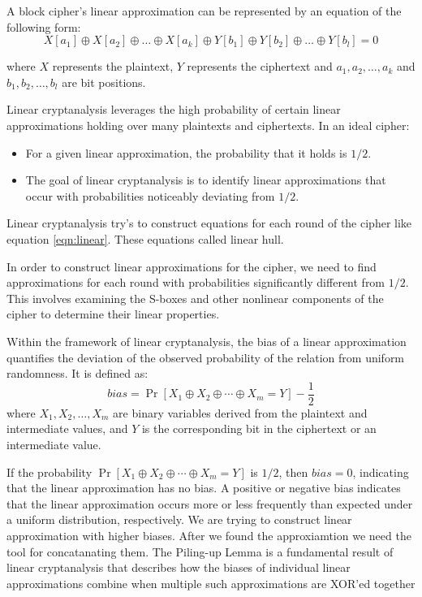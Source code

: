 \begin{definition}
A block cipher’s linear approximation can be represented by an equation of the following form:
\begin{equation}
 X[a_1] \oplus X[a_2] \oplus \ldots \oplus X[a_k] \oplus Y[b_1] \oplus Y[b_2] \oplus \ldots \oplus Y[b_l] = 0
\label{eqn:linear}
\end{equation}
\end{definition} 


where $X$ represents the plaintext, $Y$ represents the ciphertext and $a_1, a_2, \ldots, a_k$ and $b_1, b_2, \ldots, b_l$ are bit positions.

Linear cryptanalysis leverages the high probability of certain linear approximations holding over many plaintexts and ciphertexts. In an ideal cipher:
\begin{itemize}
    \item For a given linear approximation, the probability that it holds is $1/2$.
    \item The goal of linear cryptanalysis is to identify linear approximations that occur with probabilities noticeably deviating from $1/2$.
\end{itemize}

Linear cryptanalysis try's to construct equations for each round of the cipher like equation \ref{eqn:linear}. These equations called linear hull.

In order to construct linear approximations for the cipher, we need to find approximations for each round with probabilities significantly different from $1/2$. This involves examining the S-boxes and other nonlinear components of the cipher to determine their linear properties.

\begin{definition}
Within the framework of linear cryptanalysis, the bias of a linear approximation quantifies the deviation of the observed probability of the relation from uniform randomness. It is defined as:
\begin{equation}
bias = \Pr[X_1 \oplus X_2 \oplus \cdots \oplus X_m = Y] - \frac{1}{2}    
\end{equation}
where $X_1, X_2, \ldots, X_m$ are binary variables derived from the plaintext and intermediate values, and $Y$ is the corresponding bit in the ciphertext or an intermediate value. 

\end{definition}
If the probability $\Pr[X_1 \oplus X_2 \oplus \cdots \oplus X_m = Y]$ is $1/2$, then $bias = 0$, indicating that the linear approximation has no bias. A positive or negative bias indicates that the linear approximation occurs more or less frequently than expected under a uniform distribution, respectively. We are trying to construct linear approximation with higher biases. After we found the approxiamtion we need the tool for concatanating them. The Piling-up Lemma is a fundamental result of linear cryptanalysis that describes how the biases of individual linear approximations combine when multiple such approximations are XOR'ed together

